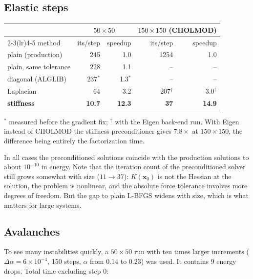 \documentclass[11pt,a4paper]{article}
\theoremstyle{remark}
\newcommand{\x}{\bm{x}}
\begin{document}
\subsection{Elastic steps}

\begin{center}
\begin{tabular}{lrrrr}
\toprule
& \multicolumn{2}{c}{$50\times50$} & \multicolumn{2}{c}{$150\times150$ (CHOLMOD)}\\
\cmidrule(lr){2-3}\cmidrule(lr){4-5}
method & its/step & speedup & its/step & speedup\\
\midrule
plain (production) & 245 & 1.0 & 1254 & 1.0\\
plain, same tolerance & 228 & 1.1 & -- & --\\
diagonal (ALGLIB) & 237$^\ast$ & 1.3$^\ast$ & -- & --\\
Laplacian & 64 & 3.2 & 207$^\dagger$ & 3.0$^\dagger$\\
\textbf{stiffness} & \textbf{10.7} & \textbf{12.3} & \textbf{37} & \textbf{14.9}\\
\bottomrule
\end{tabular}
\end{center}
{\footnotesize $^\ast$ measured before the gradient fix; $^\dagger$ with the Eigen back-end run.
With Eigen instead of CHOLMOD the stiffness preconditioner gives $7.8\times$ at $150\times150$, the
difference being entirely the factorization time.}

In all cases the preconditioned solutions coincide with the production solutions to about
$10^{-10}$ in energy. Note that the iteration count of the preconditioned solver still grows
somewhat with size ($11\to37$): $K(\x_0)$ is not the Hessian at the solution, the problem is
nonlinear, and the absolute force tolerance involves more degrees of freedom. But the gap to
plain L-BFGS widens with size, which is what matters for large systems.

\subsection{Avalanches}

To see many instabilities quickly, a $50\times50$ run with ten times larger increments
($\Delta\alpha=6\times10^{-4}$, 150 steps, $\alpha$ from 0.14 to 0.23) was used. It contains 9
energy drops. Total time excluding step 0:
\end{document}
